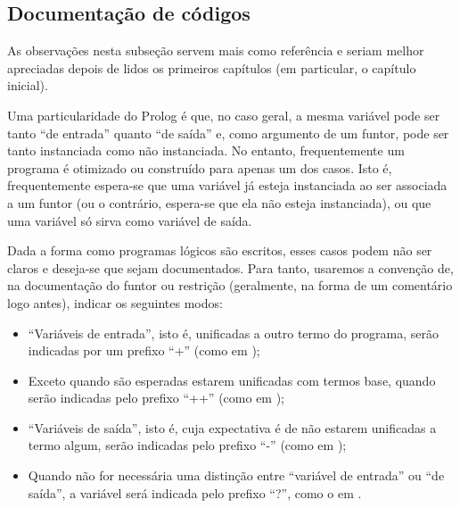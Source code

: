 \documentclass{article}
\begin{document}
\subsection*{Documentação de códigos}

  As observações nesta subseção servem mais como referência e seriam melhor apreciadas depois de
  lidos os primeiros capítulos (em particular, o capítulo inicial).

  Uma particularidade do Prolog é que, no caso geral, a mesma variável pode ser tanto ``de entrada''
  quanto ``de saída'' e, como argumento de um funtor, pode ser tanto instanciada como não
  instanciada. No entanto, frequentemente um programa é otimizado ou construído para apenas um dos
  casos. Isto é, frequentemente espera-se que uma variável já esteja instanciada ao ser associada a
  um funtor (ou o contrário, espera-se que ela não esteja instanciada), ou que uma variável só sirva
  como variável de saída.

  Dada a forma como programas lógicos são escritos, esses casos podem não ser claros e deseja-se que
  sejam documentados. Para tanto, usaremos a convenção de, na documentação do funtor ou restrição (geralmente, na
  forma de um comentário logo antes), indicar os seguintes modos:

  \begin{itemize}
    \item ``Variáveis de entrada'', isto é, unificadas a outro termo do programa, serão indicadas
      por um prefixo ``+'' (como em );
    \item Exceto quando são esperadas estarem unificadas com termos base, quando serão indicadas
      pelo prefixo ``++'' (como em );
    \item ``Variáveis de saída'', isto é, cuja expectativa é de não estarem unificadas a termo
      algum, serão indicadas pelo prefixo ``-'' (como em );
    \item Quando não for necessária uma distinção entre ``variável de entrada'' ou ``de saída'', a
      variável será indicada pelo prefixo ``?'', como o  em .
  \end{itemize}
\end{document}
